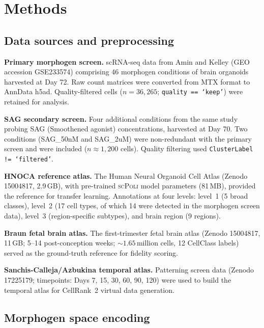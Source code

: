 \documentclass[times,twoside]{zHenriquesLab-StyleBioRxiv}
\newcommand{\scpoli}{\textsc{scPoli}}
\begin{document}
\section*{Methods}

\subsection*{Data sources and preprocessing}

\textbf{Primary morphogen screen.} scRNA-seq data from Amin and Kelley \cite{Amin2024} (GEO accession GSE233574) comprising 46 morphogen conditions of brain organoids harvested at Day 72. Raw count matrices were converted from MTX format to AnnData h5ad. Quality-filtered cells ($n{=}36{,}265$; \texttt{quality == `keep'}) were retained for analysis.

\textbf{SAG secondary screen.} Four additional conditions from the same study probing SAG (Smoothened agonist) concentrations, harvested at Day 70. Two conditions (SAG\_50nM and SAG\_2uM) were non-redundant with the primary screen and were included ($n{\approx}1{,}200$ cells). Quality filtering used \texttt{ClusterLabel != `filtered'}.

\textbf{HNOCA reference atlas.} The Human Neural Organoid Cell Atlas \cite{He2024hnoca} (Zenodo 15004817, 2.9\,GB), with pre-trained \scpoli{} model parameters (81\,MB), provided the reference for transfer learning. Annotations at four levels: level~1 (5 broad classes), level~2 (17 cell types, of which 14 were detected in the morphogen screen data), level~3 (region-specific subtypes), and brain region (9 regions).

\textbf{Braun fetal brain atlas.} The first-trimester fetal brain atlas \cite{Braun2023} (Zenodo 15004817, 11\,GB; 5--14 post-conception weeks; ${\sim}1.65$\,million cells, 12 CellClass labels) served as the ground-truth reference for fidelity scoring.

\textbf{Sanchis-Calleja/Azbukina temporal atlas.} Patterning screen data \cite{SanchisCalleja2025} (Zenodo 17225179; timepoints: Days 7, 15, 30, 60, 90, 120) were used to build the temporal atlas for CellRank~2 virtual data generation.

\subsection*{Morphogen space encoding}
\end{document}
